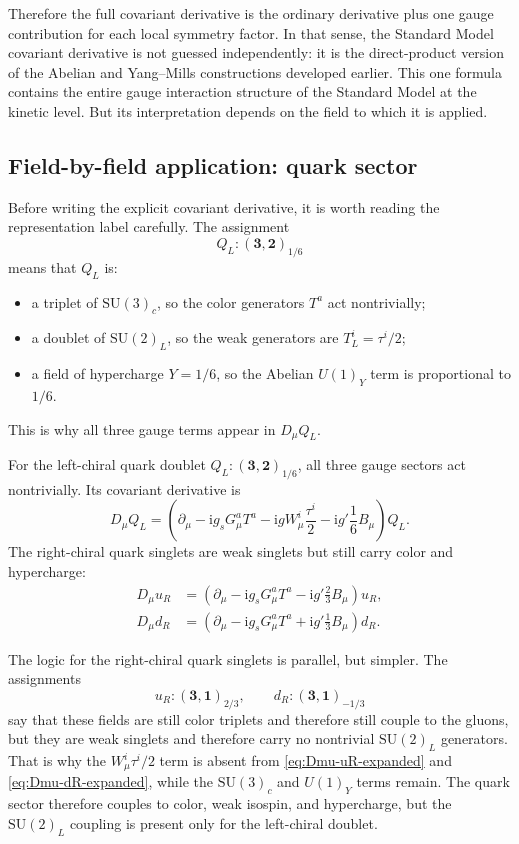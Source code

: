 \documentclass[11pt,a4paper]{article}
\newcommand{\ii}{\mathrm{i}}
\newcommand{\p}{\partial}
\newcommand{\SUc}{\mathrm{SU}(3)_c}
\newcommand{\SUw}{\mathrm{SU}(2)_L}
\begin{document}
Therefore the full covariant derivative is the ordinary derivative plus one gauge contribution for each local symmetry factor. In that sense, the Standard Model covariant derivative is not guessed independently: it is the direct-product version of the Abelian and Yang--Mills constructions developed earlier.
This one formula contains the entire gauge interaction structure of the Standard Model at the kinetic level. But its interpretation depends on the field to which it is applied.



\subsection{Field-by-field application: quark sector}

Before writing the explicit covariant derivative, it is worth reading the representation label carefully. The assignment
\[
Q_L:(\mathbf{3},\mathbf{2})_{1/6}
\]
means that \(Q_L\) is:
\begin{itemize}[leftmargin=1.7em]
\item a triplet of \(\SUc\), so the color generators \(T^a\) act nontrivially;
\item a doublet of \(\SUw\), so the weak generators are \(T_L^i=\tau^i/2\);
\item a field of hypercharge \(Y=1/6\), so the Abelian \(U(1)_Y\) term is proportional to \(1/6\).
\end{itemize}
This is why all three gauge terms appear in \(D_\mu Q_L\).

For the left-chiral quark doublet \(Q_L:(\mathbf{3},\mathbf{2})_{1/6}\), all three gauge sectors act nontrivially. Its covariant derivative is
\begin{equation}
D_\mu Q_L=
\left(
\p_\mu-\ii g_s G_\mu^aT^a-\ii gW_\mu^i\frac{\tau^i}{2}-\ii g'\frac16 B_\mu
\right)Q_L.
\label{eq:Dmu-QL-expanded}
\end{equation}
The right-chiral quark singlets are weak singlets but still carry color and hypercharge:
\begin{align}
D_\mu u_R &=
\left(\p_\mu-\ii g_s G_\mu^aT^a-\ii g'\frac23 B_\mu\right)u_R,
\label{eq:Dmu-uR-expanded}\\
D_\mu d_R &=
\left(\p_\mu-\ii g_s G_\mu^aT^a+\ii g'\frac13 B_\mu\right)d_R.
\label{eq:Dmu-dR-expanded}
\end{align}

The logic for the right-chiral quark singlets is parallel, but simpler. The assignments
\[
u_R:(\mathbf{3},\mathbf{1})_{2/3},
\qquad
d_R:(\mathbf{3},\mathbf{1})_{-1/3}
\]
say that these fields are still color triplets and therefore still couple to the gluons, but they are weak singlets and therefore carry no nontrivial \(\SUw\) generators. That is why the \(W_\mu^i\tau^i/2\) term is absent from \eqref{eq:Dmu-uR-expanded} and \eqref{eq:Dmu-dR-expanded}, while the \(\SUc\) and \(U(1)_Y\) terms remain.
The quark sector therefore couples to color, weak isospin, and hypercharge, but the \(\SUw\) coupling is present only for the left-chiral doublet.
\end{document}
